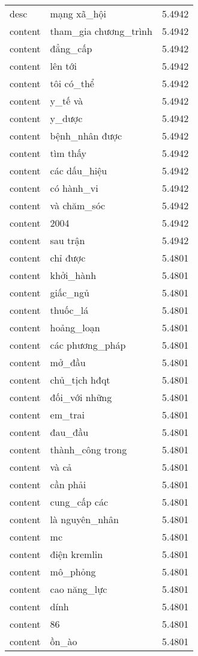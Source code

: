 \documentclass{article}
\begin{document}
\begin{tabular}{lll}
desc & mạng xã\_hội & 5.4942\\
content & tham\_gia chương\_trình & 5.4942\\
content & đẳng\_cấp & 5.4942\\
content & lên tới & 5.4942\\
content & tôi có\_thể & 5.4942\\
content & y\_tế và & 5.4942\\
content & y\_dược & 5.4942\\
content & bệnh\_nhân được & 5.4942\\
content & tìm thấy & 5.4942\\
content & các dấu\_hiệu & 5.4942\\
content & có hành\_vi & 5.4942\\
content & và chăm\_sóc & 5.4942\\
content & 2004 & 5.4942\\
content & sau trận & 5.4942\\
content & chỉ được & 5.4801\\
content & khởi\_hành & 5.4801\\
content & giấc\_ngủ & 5.4801\\
content & thuốc\_lá & 5.4801\\
content & hoảng\_loạn & 5.4801\\
content & các phương\_pháp & 5.4801\\
content & mở\_đầu & 5.4801\\
content & chủ\_tịch hđqt & 5.4801\\
content & đối\_với những & 5.4801\\
content & em\_trai & 5.4801\\
content & đau\_đầu & 5.4801\\
content & thành\_công trong & 5.4801\\
content & và cả & 5.4801\\
content & cần phải & 5.4801\\
content & cung\_cấp các & 5.4801\\
content & là nguyên\_nhân & 5.4801\\
content & mc & 5.4801\\
content & điện kremlin & 5.4801\\
content & mô\_phỏng & 5.4801\\
content & cao năng\_lực & 5.4801\\
content & dính & 5.4801\\
content & 86 & 5.4801\\
content & ồn\_ào & 5.4801\\

\end{tabular}
\end{document}
